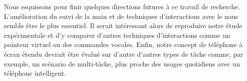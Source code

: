 Nous esquissons pour finir quelques directions futures à ce travail de recherche. L'amélioration du suivi de la main et de techniques d'interactions avec le  nous semble être le plus essentiel. Il serait intéressant alors de reproduire notre étude expérimentale et d'y comparer d'autres techniques d'interactions comme un pointeur virtuel ou des commandes vocales. Enfin, notre concept de téléphone à écran étendu devrait être évalué sur d'autre d'autres types de tâche comme, par exemple, un scénario de multi-tâche, plus proche des usages quotidiens avec un téléphone intelligent.